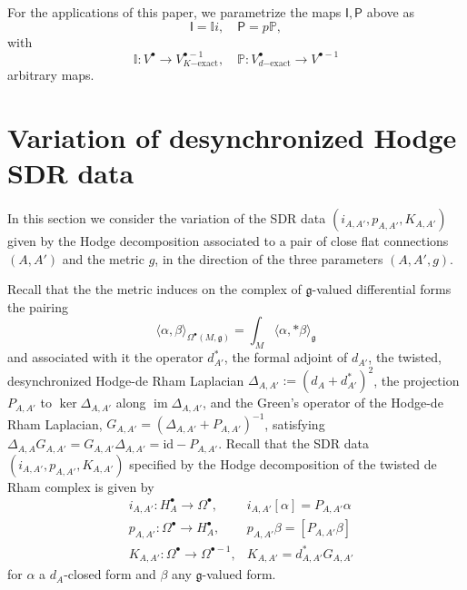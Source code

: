 \documentclass[11pt,a4paper]{amsart}
\theoremstyle{plain} %
\theoremstyle{definition}
\theoremstyle{remark}
\newcommand{\g}{\mathfrak{g}}
\newcommand{\dd}{d}
\newcommand{\mr}{\mathrm}
\newcommand{\bt}{\bullet}
\newcommand{\ra}{\rightarrow}
\begin{document}
For the applications of this paper, we parametrize the maps $\mathsf{I},\mathsf{P}$ above as 
\begin{equation}
    \mathsf{I}=\mathbb{I}i,\quad \mathsf{P}=p\mathbb{P},
\end{equation}
with
\begin{equation}
    \mathbb{I}\colon V^\bt \ra V^{\bt-1}_{K\mr{-exact}}, \quad 
    \mathbb{P}\colon V^\bt_{d\mr{-exact}}\ra V^{\bt-1}
\end{equation}
arbitrary maps.




\section{Variation of desynchronized Hodge SDR data}

In this section we consider the variation of the SDR data $(i_{A,A'},p_{A,A'},K_{A,A'})$ given by the Hodge decomposition associated to a pair of close flat connections $(A,A')$ and the metric $g$, in the direction of the three parameters $(A,A',g)$.  

Recall that the the metric induces on the complex of $\g$-valued differential forms the pairing
\begin{equation}
\langle \alpha, \beta \rangle_{\Omega^\bullet(M,\g)} = \int_M \langle \alpha, *\beta\rangle_\g
\end{equation}
and associated with it the operator $\dd^*_{A'}$, the formal adjoint of $\dd_{A'}$, the twisted, desynchronized Hodge-de Rham Laplacian $\Delta_{A,A'} := (\dd_{A} + \dd^*_{A'})^2$, the projection $P_{A,A'}$ to $\ker \Delta_{A,A'}$ along $\operatorname{im} \Delta_{A,A'}$, and the Green's operator of the Hodge-de Rham Laplacian, $G_{A,A'} = (\Delta_{A,A'} + P_{A,A'})^{-1}$, satisfying 
$\Delta_{A,A}G_{A,A'} = G_{A,A'}\Delta_{A,A'} = \mathrm{id} - P_{A,A'}$.
Recall that the SDR data  $(i_{A,A'},p_{A,A'},K_{A,A'})$ specified by the Hodge decomposition of the twisted de Rham complex is given by 
\begin{align} 
&i_{A,A'} \colon H^\bullet_A \to \Omega^\bullet,  &i_{A,A'}[\alpha] = P_{A,A'}\alpha \\
&p_{A,A'}\colon \Omega^\bullet \to H^\bullet_{A},  &p_{A,A'}\beta = \left[P_{A,A'}\beta\right] \\ 
&K_{A,A'} \colon \Omega^\bullet \to \Omega^{\bullet-1}, &K_{A,A'}= \dd^*_{A,A'}  G_{A,A'}
\end{align}
for $\alpha$ a $d_{A}$-closed form and $\beta$ any $\g$-valued form. 
\end{document}
